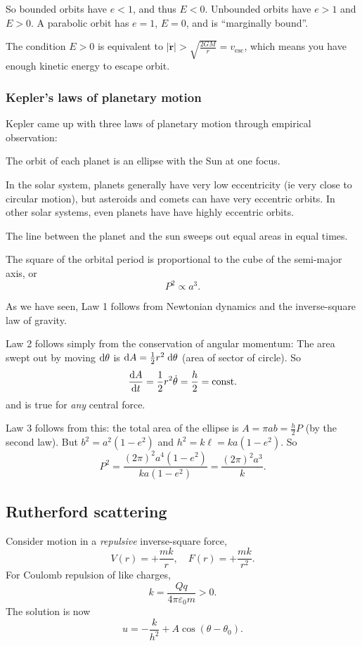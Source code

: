 \documentclass[a4paper]{article}
\begin{document}
So bounded orbits have $e < 1$, and thus $E < 0$. Unbounded orbits have $e > 1$ and $E > 0$. A parabolic orbit has $e = 1$, $E = 0$, and is ``marginally bound''.

The condition $E > 0$ is equivalent to $|\dot{\mathbf{r}}| > \sqrt{\frac{2GM}{r}} = v_{\mathrm{esc}}$, which means you have enough kinetic energy to escape orbit.

\subsubsection{Kepler's laws of planetary motion}
Kepler came up with three laws of planetary motion through empirical observation:
\begin{law}
  The orbit of each planet is an ellipse with the Sun at one focus.
\end{law}
\note In the solar system, planets generally have very low eccentricity (ie very close to circular motion), but asteroids and comets can have very eccentric orbits. In other solar systems, even planets have have highly eccentric orbits.

\begin{law}
  The line between the planet and the sun sweeps out equal areas in equal times.
\end{law}

\begin{law}
  The square of the orbital period is proportional to the cube of the semi-major axis, or
  \[
    P^2 \propto a^3.
  \]
\end{law}

As we have seen, Law 1 follows from Newtonian dynamics and the inverse-square law of gravity.

Law 2 follows simply from the conservation of angular momentum: The area swept out by moving $\mathrm{d} \theta$ is $\mathrm{d} A = \frac{1}{2}r^2\;\mathrm{d} \theta$ (area of sector of circle). So
\[
  \frac{\mathrm{d} A}{\mathrm{d} t} = \frac{1}{2}r^2\dot{\theta} = \frac{h}{2} = \text{const}.
\]
and is true for \emph{any} central force.

Law 3 follows from this: the total area of the ellipse is $A = \pi ab = \frac{h}{2}P$ (by the second law). But $b^2 = a^2( 1 - e^2)$ and $h^2 = k\ell = ka(1 - e^2)$. So
\[
  P^2 = \frac{(2\pi)^2a^4(1 - e^2)}{ka(1 - e^2)} = \frac{(2\pi)^2 a^3}{k}.
\]

\subsection{Rutherford scattering}
Consider motion in a \emph{repulsive} inverse-square force,
\[
  V(r) = +\frac{mk}{r}, \quad F(r) = +\frac{mk}{r^2}.
\]
For Coulomb repulsion of like charges,
\[
  k = \frac{Qq}{4\pi \varepsilon_0 m} > 0.
\]
The solution is now
\[
  u = -\frac{k}{h^2} + A\cos (\theta - \theta_0).
\]
\end{document}
